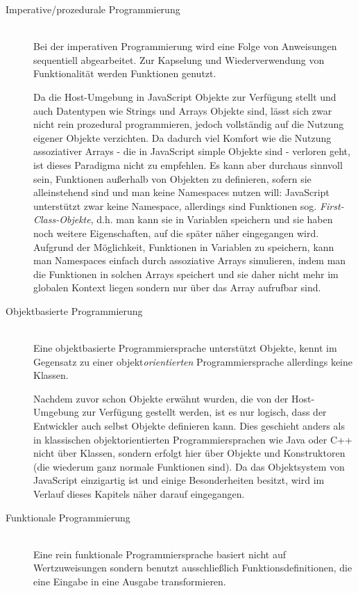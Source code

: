 \begin{description}
\item[Imperative/prozedurale Programmierung] \hfill \\
Bei der imperativen Programmierung wird eine Folge von Anweisungen sequentiell abgearbeitet. Zur
Kapselung und Wiederverwendung von Funktionalität werden Funktionen genutzt.
\citep[Kap. 1.3.1]{progsprachen}

Da die Host-Umgebung in JavaScript Objekte zur Verfügung stellt und auch Datentypen wie Strings und
Arrays Objekte sind, lässt sich zwar nicht rein prozedural programmieren, jedoch vollständig
auf die Nutzung eigener Objekte verzichten. Da dadurch viel Komfort wie die Nutzung assoziativer
Arrays - die in JavaScript simple Objekte sind - verloren geht, ist dieses Paradigma nicht zu
empfehlen. Es kann aber durchaus sinnvoll sein, Funktionen außerhalb von Objekten zu definieren,
sofern sie alleinstehend sind und man keine Namespaces nutzen will: JavaScript unterstützt zwar
keine Namespace, allerdings sind Funktionen sog. \emph{First-Class-Objekte}, d.h. man kann sie in
Variablen speichern und sie haben noch weitere Eigenschaften, auf die später näher eingegangen
wird. Aufgrund der Möglichkeit, Funktionen in Variablen zu speichern, kann man Namespaces einfach
durch assoziative Arrays simulieren, indem man die Funktionen in solchen Arrays speichert und sie
daher nicht mehr im globalen Kontext liegen sondern nur über das Array aufrufbar sind.

\item[Objektbasierte Programmierung] \hfill \\
Eine objektbasierte Programmiersprache unterstützt Objekte, kennt im Gegensatz zu einer
objekt\emph{orientierten} Programmiersprache allerdings keine Klassen.
\citep[Kap. 1.3.1]{progsprachen}

Nachdem zuvor schon Objekte erwähnt wurden, die von der Host-Umgebung zur Verfügung gestellt werden,
ist es nur logisch, dass der Entwickler auch selbst Objekte definieren kann. Dies geschieht anders
als in klassischen objektorientierten Programmiersprachen wie Java oder C++ nicht über Klassen,
sondern erfolgt hier über Objekte und Konstruktoren (die wiederum ganz normale Funktionen sind).  Da
das Objektsystem von JavaScript einzigartig ist und einige Besonderheiten besitzt, wird im Verlauf
dieses Kapitels näher darauf eingegangen.

\item[Funktionale Programmierung] \hfill \\
Eine rein funktionale Programmiersprache basiert nicht auf Wertzuweisungen sondern benutzt
ausschließlich Funktionsdefinitionen, die eine Eingabe in eine Ausgabe transformieren.
\citep[Kap. 1.3.1]{progsprachen}


\end{description}
